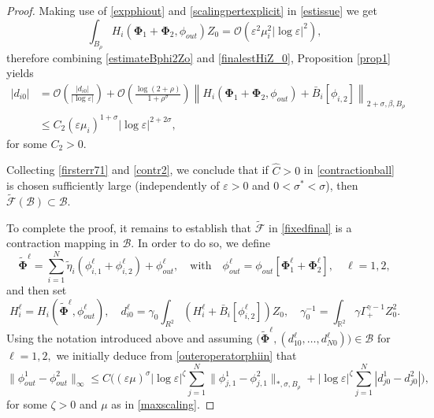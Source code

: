 \documentclass[11pt,reqno,a4paper]{amsart}
\numberwithin{equation}{section}
\newcommand{\R}{\mathbb{R}}
\newcommand{\ve}{\varepsilon}
\begin{document}
\begin{proof}
Making use of \eqref{expphiout} and \eqref{scalingpertexplicit} in \eqref{estissue} we get
\begin{equation}\label{finalestHiZ_0}
\int_{B_{\rho}}H_i\left(\mathbf{\Phi}_1+\mathbf{\Phi}_2,\phi_{out}\right)Z_0=\mathcal{O}\left(\ve^2\mu_i^2|\log\ve|^2\right),
\end{equation}
therefore combining \eqref{estimateBphi2Zo} and \eqref{finalestHiZ_0}, Proposition \ref{prop1} yields
\begin{equation}\label{contr2}
\begin{aligned}
|d_{i0}|&=\mathcal{O}\left(\frac{|d_{i0}|}{|\log\ve|}\right)+\mathcal{O}\left(\frac{\log(2+\rho)}{1+\rho^{\sigma}}\right)\left\|H_i\left(\mathbf{\Phi}_1+\mathbf{\Phi}_2,\phi_{out}\right)+\bar{B}_i[\phi_{i,2}]\right\|_{2+\sigma,\beta,B_{\rho}}\\
&\leq C_2 (\ve\mu_i)^{1+\sigma}|\log\ve|^{2+2\sigma},
\end{aligned}
\end{equation}
for some $C_2>0.$

Collecting \eqref{firsterr71} and \eqref{contr2}, we conclude that if $\widehat{C}>0$ in \eqref{contractionball} is chosen sufficiently large (independently of $\ve>0$ and $0<\sigma^{*}<\sigma$), then $\widetilde{\mathcal{F}}(\mathcal{B})\subset \mathcal{B}$. 

To complete the proof, it remains to establish that $\widetilde{\mathcal{F}}$ in \eqref{fixedfinal} is a contraction mapping in $\mathcal{B}$. In order to do so, we define 
\[\widetilde{\mathbf{\Phi}}^{\ell}=\sum_{i=1}^{N}\tilde{\eta}_i\left(\phi^{\ell}_{i,1}+\phi^{\ell}_{i,2}\right)+\phi^{\ell}_{out}, \quad\mbox{with} \quad \phi_{out}^{\ell}=\phi_{out}[\mathbf{\Phi}_{1}^{\ell}+\mathbf{\Phi}_{2}^{\ell}], \quad \ell=1,2,\]
and then set
\[H_i^{\ell}=H_i\left(\widetilde{\mathbf{\Phi}}^{\ell},\phi_{out}^{\ell}\right),\quad d^{\ell}_{i0}=\gamma_{0}\int_{R^2} \left(H_i^{\ell}+\bar{B}_i[\phi^{\ell}_{i,2}]\right)Z_0, \quad \gamma_0^{-1}=\int_{\R^2}\gamma\Gamma^{\gamma-1}_{+}Z_0^2.\]
Using the notation introduced above and assuming  $\big(\widetilde{\mathbf{\Phi}}^{\ell},\left(d_{10}^{\ell},\dots,d_{N0}^{\ell}\right)\big)\in\mathcal{B}$ for $\ell=1,2,$ we initially deduce from  \eqref{outeroperatorphiin} that
\begin{equation}\label{phioutcontraction}
\|\phi^1_{out}-\phi^2_{out}\|_{\infty}\leq C\bigg((\ve\mu)^{\sigma}|\log\ve|^{\zeta}\sum_{j=1}^{N}\|\phi^1_{j,1}-\phi^2_{j,1}\|_{*,\sigma,B_{\rho}}+|\log\ve|^{\zeta}\sum_{j=1}^{N}|d_{j0}^1-d_{j0}^2|\bigg),
\end{equation}
for some $\zeta>0$ and $\mu$ as in \eqref{maxscaling}.


\end{proof}
\end{document}
